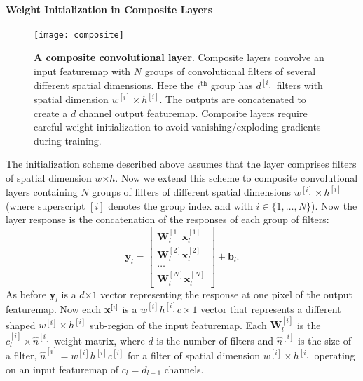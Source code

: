 \documentclass[thesis]{subfiles}
\begin{document}
    \paragraph{Weight Initialization in Composite Layers}
    \begin{figure}[tbp]
        \centering
        \texttt{[image: composite]}
        \caption[A composite convolutional layer]{{\bf A composite convolutional layer}. Composite layers convolve an input \gls{featuremap} with $N$ groups of convolutional filters of several different spatial dimensions. Here the $i^\text{th}$ group has $d^{[i]}$ filters with spatial dimension $w^{[i]} \times h^{[i]}$. The outputs are concatenated to create a $d$ channel output \gls{featuremap}. Composite layers require careful weight initialization to avoid vanishing/exploding gradients during training.}
        \label{fig:compositelayers}
    \end{figure}
    
    The initialization scheme described above assumes that the layer comprises filters of spatial dimension $w$$\times$$h$. Now we extend this scheme to composite convolutional layers containing $N$ groups of filters of different spatial dimensions $w^{[i]} \times h^{[i]}$ (where superscript $[i]$ denotes the group index and with $i\in \{1,\dots,N\}$). Now the layer response is the concatenation of the responses of each group of filters:
    \begin{equation}
    \mathbf{y}_l =\begin{bmatrix}\mathbf{W}_l^{[1]} \mathbf{x}_l^{[1]} \\ \mathbf{W}_l^{[2]} \mathbf{x}_l^{[2]} \\ \dots \\ \mathbf{W}_l^{[N]} \mathbf{x}_l^{[N]} \end{bmatrix} + \mathbf{b}_l.
    \end{equation}
    As before $\mathbf{y}_l$ is a $d$$\times$$1$ vector representing the response at one pixel of the output \gls{featuremap}. Now each ${\bf x}^{[i]}$ is a $w^{[i]} h^{[i]} c \times 1$ vector that represents a different shaped $w^{[i]} \times h^{[i]}$ sub-region of the input \gls{featuremap}. Each $\mathbf{W}_l^{[i]}$ is the $c_l^{[i]}\times \hat{n}^{[i]}$ weight matrix, where $d$ is the number of filters and $\hat{n}^{[i]}$ is the size of a filter, \ie $\hat{n}^{[i]} = w^{[i]} h^{[i]} c^{[i]}$ for a filter of spatial dimension $w^{[i]} \times h^{[i]}$ operating on an input \gls{featuremap} of $c_l = d_{l-1}$ channels.
    
\end{document}
